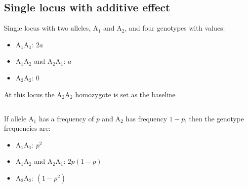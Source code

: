 \documentclass[
  letterpaper,
  DIV=11,
  numbers=noendperiod]{scrartcl}
\providecommand{\tightlist}{%
  \setlength{\itemsep}{0pt}\setlength{\parskip}{0pt}}
\begin{document}
\subsection{Single locus with additive
effect}\label{single-locus-with-additive-effect}

Single locus with two alleles, \(\mathrm{A}_1\) and \(\mathrm{A}_2\),
and four genotypes with values:

\begin{itemize}
\tightlist
\item
  \(\mathrm{A}_1\mathrm{A}_1\): \(2a\)
\item
  \(\mathrm{A}_1\mathrm{A}_2\) and \(\mathrm{A}_2\mathrm{A}_1\): \(a\)
\item
  \(\mathrm{A}_2\mathrm{A}_2\): \(0\)
\end{itemize}

At this locus the \(\mathrm{A}_2\mathrm{A}_2\) homozygote is set as the
baseline

\subsection{}\label{section}

If allele \(\mathrm{A}_1\) has a frequency of \(p\) and \(\mathrm{A}_2\)
has frequency \(1-p\), then the genotype frequencies are:

\begin{itemize}
\tightlist
\item
  \(\mathrm{A}_1\mathrm{A}_1\): \(p^2\)
\item
  \(\mathrm{A}_1\mathrm{A}_2\) and \(\mathrm{A}_2\mathrm{A}_1\):
  \(2p(1-p)\)
\item
  \(\mathrm{A}_2\mathrm{A}_2\): \((1-p^2)\)
\end{itemize}

\subsection{}\label{section-1}
\end{document}
